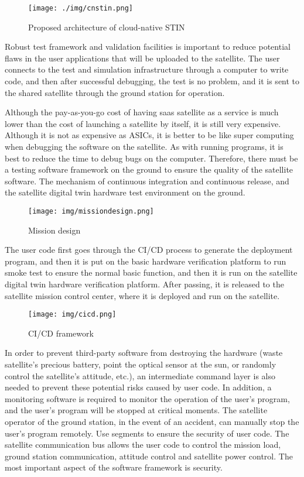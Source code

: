 \documentclass[12pt, draftclsnofoot, onecolumn]{IEEEtran}
\begin{document}
\begin{figure}[H]
	\centering
	\texttt{[image: ./img/cnstin.png]}
	\caption{Proposed architecture of cloud-native STIN}
\end{figure}


Robust test framework and validation facilities is important to reduce potential flaws in the user applications that will be uploaded to the satellite.
The user connects to the test and simulation infrastructure through a computer to write code, and then after successful debugging, the test is no problem, and it is sent to the shared satellite through the ground station for operation.

Although the pay-as-you-go cost of having saas satellite as a service is much lower than the cost of launching a satellite by itself, it is still very expensive. Although it is not as expensive as ASICs, it is better to be like super computing when debugging the software on the satellite.  As with running programs, it is best to reduce the time to debug bugs on the computer.  Therefore, there must be a testing software framework on the ground to ensure the quality of the satellite software.  The mechanism of continuous integration and continuous release, and the satellite digital twin hardware test environment on the ground.
\begin{figure}
	\centering
	\texttt{[image: img/missiondesign.png]}
	\caption{Mission design}
\end{figure}


The user code first goes through the CI/CD process to generate the deployment program, and then it is put on the basic hardware verification platform to run smoke test to ensure the normal basic function, and then it is run on the satellite digital twin hardware verification platform. After passing, it is released to the satellite mission control center, where it is deployed and run on the satellite.
\begin{figure}[H]
	\centering
	\texttt{[image: img/cicd.png]}
	\caption{CI/CD framework}
\end{figure}


In order to prevent third-party software from destroying the hardware (waste satellite's precious battery, point the optical sensor at the sun, or randomly control the satellite's attitude, etc.), an intermediate command layer is also needed to prevent these potential risks caused by user code.  In addition, a monitoring software is required to monitor the operation of the user's program, and the user's program will be stopped at critical moments.  The satellite operator of the ground station, in the event of an accident, can manually stop the user's program remotely.  Use segments to ensure the security of user code.  The satellite communication bus allows the user code to control the mission load, ground station communication, attitude control and satellite power control.  The most important aspect of the software framework is security.
\end{document}
